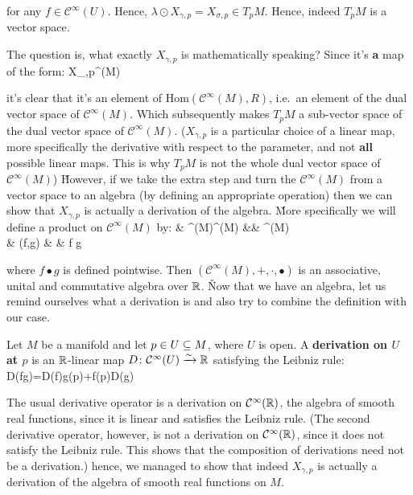 for any $f\in \mathcal{C}^\infty(U)$. Hence, $\lambda \odot X_{\gamma,p}=X_{\sigma,p}\in T_p M$. Hence, indeed $T_p M$
is a vector space. \qedhere
\een
\eq

The question is, what exactly $X_{\gamma,p}$ is mathematically speaking? Since it's \textbf{a} map of the form:
X_{\gamma,p}\cl {}^\infty(M) \xrightarrow{\sim} \R
\ei

it's clear that it's an element of $\mathrm{Hom}(\mathcal{C}^\infty(M),R)$, i.e.\ an element of the dual vector space
of $\mathcal{C}^\infty(M)$. Which subsequently makes $T_p M$ a sub-vector space of the dual vector space of
$\mathcal{C}^\infty(M)$. ($X_{\gamma,p}$ is a particular choice of a linear map, more specifically the derivative
with respect to the parameter, and not \textbf{all} possible linear maps. This is why $T_p M$ is not the whole dual
vector space of $\mathcal{C}^\infty(M)$) \v

However, if we take the extra step and turn the $\mathcal{C}^\infty(M)$ from a vector space to an algebra (by
defining an appropriate operation) then we can show that $X_{\gamma,p}$ is actually a derivation of the algebra. \v

More specifically we will define a product on $\mathcal{C}^\infty(M)$ by:
\bullet \cl & ^\infty(M)\times {}^\infty(M) &\to& ^\infty(M)\\
& (f,g) & \mapsto & f \bullet g
\ei

where $f \bullet g$ is defined pointwise. Then $(\mathcal{C}^\infty(M),+,\cdot,\bullet)$ is an associative, unital
and commutative algebra over $\mathbb{R}$. \v

Now that we have an algebra, let us remind ourselves what a derivation is and also try to combine the definition with
our case.

Let $M$ be a manifold and let $p\in U \subseteq M$, where $U$ is open. A \textbf{derivation on $U$ at $p$} is an $\mathbb{R}$-linear
map $D\colon \mathcal{C}^\infty(U)\xrightarrow{\sim}\mathbb{R}$ satisfying the Leibniz rule:
\bse
D(fg)=D(f)g(p)+f(p)D(g)
\ese
\ed

The usual derivative operator is a derivation on $\mathcal{C}^\infty(\mathbb{R})$, the algebra of smooth real functions,
since it is linear and satisfies the Leibniz rule. (The second derivative operator, however, is not a derivation on
$\mathcal{C}^\infty(\mathbb{R})$, since it does not satisfy the Leibniz rule. This shows that the composition of derivations
need not be a derivation.) hence, we managed to show that indeed $X_{\gamma,p}$ is actually a derivation of the
algebra of smooth real functions on $M$.

